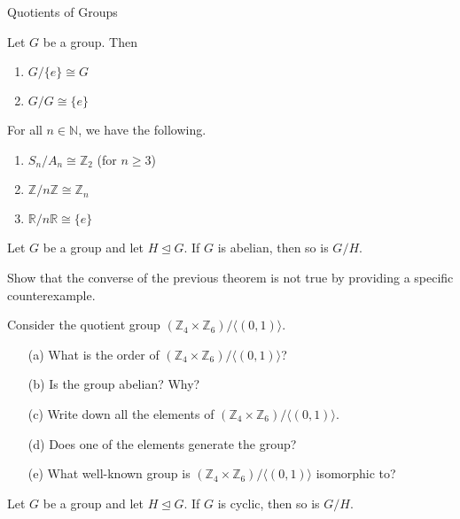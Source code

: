 \begin{section}{Quotients of Groups}
\begin{theorem}
Let $G$ be a group.  Then
\begin{enumerate}
\item $G/\{e\}\cong G$
\item $G/G\cong \{e\}$
\end{enumerate}
\end{theorem}

\begin{theorem}
For all $n\in \mathbb{N}$, we have the following.
\begin{enumerate}
\item $S_n/A_n\cong \mathbb{Z}_2$ (for $n\geq 3$)
\item $\mathbb{Z}/n\mathbb{Z}\cong \mathbb{Z}_n$
\item $\mathbb{R}/n\mathbb{R}\cong \{e\}$
\end{enumerate}
\end{theorem}

\begin{theorem}
Let $G$ be a group and let $H\trianglelefteq G$.  If $G$ is abelian, then so is $G/H$.
\end{theorem}

\begin{problem}
Show that the converse of the previous theorem is not true by providing a specific counterexample.
\end{problem}

\begin{exercise}
Consider the quotient group $(\mathbb{Z}_4\times \mathbb{Z}_6)/\langle (0,1)\rangle$.
\begin{enumerate}
\item[(a)] What is the order of $(\mathbb{Z}_4\times \mathbb{Z}_6)/\langle (0,1)\rangle$?
\item[(b)] Is the group abelian?  Why?
\item[(c)] Write down all the elements of $(\mathbb{Z}_4\times \mathbb{Z}_6)/\langle (0,1)\rangle$.
\item[(d)] Does one of the elements generate the group?
\item[(e)] What well-known group is $(\mathbb{Z}_4\times \mathbb{Z}_6)/\langle (0,1)\rangle$ isomorphic to?
\end{enumerate}
\end{exercise}

\begin{theorem}
Let $G$ be a group and let $H\trianglelefteq G$.  If $G$ is cyclic, then so is $G/H$.
\end{theorem}


\end{section}
